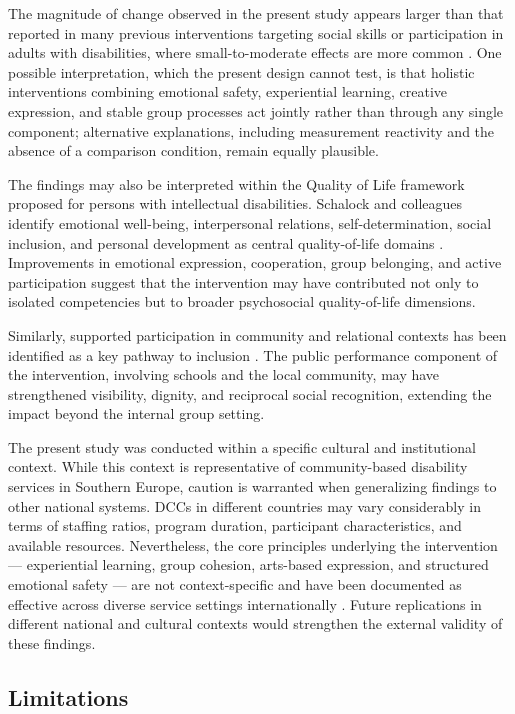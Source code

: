 \documentclass[12pt,a4paper]{article}
\begin{document}
The magnitude of change observed in the present study appears larger than that reported in many previous interventions targeting social skills or participation in adults with disabilities, where small-to-moderate effects are more common \parencite{giummarra2022}. One possible interpretation, which the present design cannot test, is that holistic interventions combining emotional safety, experiential learning, creative expression, and stable group processes act jointly rather than through any single component; alternative explanations, including measurement reactivity and the absence of a comparison condition, remain equally plausible.

The findings may also be interpreted within the Quality of Life framework proposed for persons with intellectual disabilities. Schalock and colleagues identify emotional well-being, interpersonal relations, self-determination, social inclusion, and personal development as central quality-of-life domains \parencite{schalock2010}. Improvements in emotional expression, cooperation, group belonging, and active participation suggest that the intervention may have contributed not only to isolated competencies but to broader psychosocial quality-of-life dimensions.

Similarly, supported participation in community and relational contexts has been identified as a key pathway to inclusion \parencite{bigby2015}. The public performance component of the intervention, involving schools and the local community, may have strengthened visibility, dignity, and reciprocal social recognition, extending the impact beyond the internal group setting.

The present study was conducted within a specific cultural and
institutional context. While this context is representative of
community-based disability services in Southern Europe, caution
is warranted when generalizing findings to other national systems.
DCCs in different countries may vary considerably in terms of
staffing ratios, program duration, participant characteristics,
and available resources. Nevertheless, the core principles underlying
the intervention --- experiential learning, group cohesion,
arts-based expression, and structured emotional safety --- are not
context-specific and have been documented as effective across diverse
service settings internationally \parencite{giummarra2022,leavy2015}.
Future replications in different national and cultural contexts
would strengthen the external validity of these findings.

\subsection{Limitations}
\end{document}
